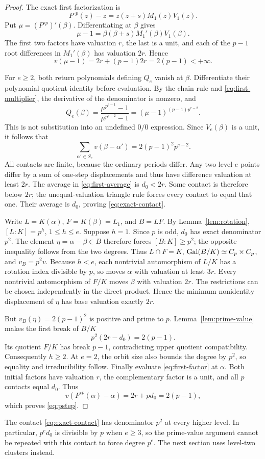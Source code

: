 \begin{proof}
The exact first factorization is
\begin{equation}\label{eq:first-factor}
 P^{\circ p}(z)-z=z(z+s)M_1(z)V_1(z).
\end{equation}
Put \(\mu=(P^{\circ p})'(\beta)\).
Differentiating at \(\beta\) gives
\[
 \mu-1=\beta(\beta+s)M_1'(\beta)V_1(\beta).
\]
The first two factors have valuation \(r\), the last is a unit,
and each of the \(p-1\) root differences in \(M_1'(\beta)\)
has valuation \(2r\). Hence
\begin{equation}\label{eq:first-multiplier}
 v(\mu-1)=2r+(p-1)2r=2(p-1)<+\infty .
\end{equation}

For \(e\ge2\), both return polynomials defining \(Q_e\) vanish
at \(\beta\). Differentiate their polynomial quotient identity
before evaluation. By the chain rule and \eqref{eq:first-multiplier},
the derivative of the denominator is nonzero, and
\[
 Q_e(\beta)=
 \frac{\mu^{p^{e-1}}-1}{\mu^{p^{e-2}}-1}
 =(\mu-1)^{(p-1)p^{e-2}} .
\]
This is not substitution into an undefined \(0/0\) expression.
Since \(V_e(\beta)\) is a unit, it follows that
\begin{equation}\label{eq:first-average}
 \sum_{\alpha'\in S_e}v(\beta-\alpha')
 =2(p-1)^2p^{e-2}.
\end{equation}
All contacts are finite, because the ordinary periods differ.
Any two level-\(e\) points differ by a sum of one-step
displacements and thus have difference valuation at least \(2r\).
The average in \eqref{eq:first-average} is \(d_0<2r\).
Some contact is therefore below \(2r\); the unequal-valuation
triangle rule forces every contact to equal that one. Their
average is \(d_0\), proving \eqref{eq:exact-contact}.

Write \(L=K(\alpha)\), \(F=K(\beta)=L_1\), and \(B=LF\).
By Lemma~\ref{lem:rotation}, \([L:K]=p^h\), \(1\le h\le e\).
Suppose \(h=1\). Since \(p\) is odd, \(d_0\) has exact
denominator \(p^2\). The element \(\eta=\alpha-\beta\in B\)
therefore forces \([B:K]\ge p^2\); the opposite inequality
follows from the two degrees. Thus \(L\cap F=K\),
\(\operatorname{Gal}(B/K)\simeq C_p\times C_p\), and \(v_B=p^2v\).
Because \(h<e\), each nontrivial automorphism of \(L/K\)
has a rotation index divisible by \(p\), so moves \(\alpha\)
with valuation at least \(3r\). Every nontrivial automorphism
of \(F/K\) moves \(\beta\) with valuation \(2r\).
The restrictions can be chosen independently in the direct
product. Hence the minimum nonidentity displacement of
\(\eta\) has base valuation exactly \(2r\).

But \(v_B(\eta)=2(p-1)^2\) is positive and prime to \(p\).
Lemma~\ref{lem:prime-value} makes the first break of \(B/K\)
\[
 p^2(2r-d_0)=2(p-1).
\]
Its quotient \(F/K\) has break \(p-1\), contradicting upper
quotient compatibility. Consequently \(h\ge2\).
At \(e=2\), the orbit size also bounds the degree by \(p^2\),
so equality and irreducibility follow.
Finally evaluate \eqref{eq:first-factor} at \(\alpha\).
Both initial factors have valuation \(r\), the complementary
factor is a unit, and all \(p\) contacts equal \(d_0\). Thus
\[
 v(P^{\circ p}(\alpha)-\alpha)=2r+p d_0=2(p-1),
\]
which proves \eqref{eq:pstep}.
\end{proof}

The contact \eqref{eq:exact-contact} has denominator \(p^2\)
at every higher level. In particular, \(p^e d_0\) is divisible
by \(p\) when \(e\ge3\), so the prime-value argument cannot be
repeated with this contact to force degree \(p^e\).
The next section uses level-two clusters instead.
